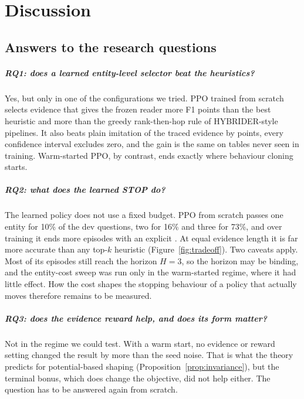 \chapter{Discussion}
\label{ch:discussion}

\section{Answers to the research questions}

\paragraph{RQ1: does a learned entity-level selector beat the heuristics?} Yes, but only in one of the configurations we tried. PPO trained from scratch selects evidence that gives the frozen reader \dScratchBm{} more F1 points than the best heuristic and \dScratchGreedy{} more than the greedy rank-then-hop rule of HYBRIDER-style pipelines. It also beats plain imitation of the traced evidence by \dScratchBc{} points, every confidence interval excludes zero, and the gain is the same on tables never seen in training. Warm-started PPO, by contrast, ends exactly where behaviour cloning starts.

\paragraph{RQ2: what does the learned STOP do?} The learned policy does not use a fixed budget. PPO from scratch passes one entity for 10\% of the dev questions, two for 16\% and three for 73\%, and over training it ends more episodes with an explicit \STOP{}. At equal evidence length it is far more accurate than any top-$k$ heuristic (Figure~\ref{fig:tradeoff}). Two caveats apply. Most of its episodes still reach the horizon $H=3$, so the horizon may be binding, and the entity-cost sweep was run only in the warm-started regime, where it had little effect. How the cost shapes the stopping behaviour of a policy that actually moves therefore remains to be measured.

\paragraph{RQ3: does the evidence reward help, and does its form matter?} Not in the regime we could test. With a warm start, no evidence or reward setting changed the result by more than the seed noise. That is what the theory predicts for potential-based shaping (Proposition~\ref{prop:invariance}), but the terminal bonus, which does change the objective, did not help either. The question has to be answered again from scratch.

